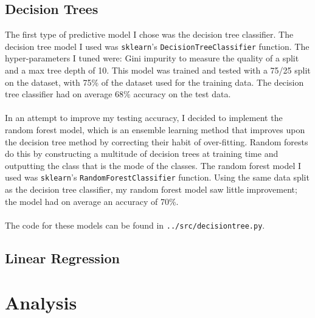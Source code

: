 \documentclass[12pt, notitlepage]{article}
\begin{document}
\subsection{Decision Trees}
The first type of predictive model I chose was the decision tree classifier. The decision tree model I used was \texttt{sklearn}'s \texttt{DecisionTreeClassifier} function. The hyper-parameters I tuned were: Gini impurity to measure the quality of a split and a max tree depth of 10. This model was trained and tested with a 75/25 split on the dataset, with 75\% of the dataset used for the training data. The decision tree classifier had on average 68\% accuracy on the test data.\\\\
In an attempt to improve my testing accuracy, I decided to implement the random forest model, which is an ensemble learning method that improves upon the decision tree method by correcting their habit of over-fitting. Random forests do this by constructing a multitude of decision trees at training time and outputting the class that is the mode of the classes. The random forest model I used was \texttt{sklearn}'s \texttt{RandomForestClassifier} function. Using the same data split as the decision tree classifier, my random forest model saw little improvement; the model had on average an accuracy of 70\%. \\\\
The code for these models can be found in \texttt{../src/decisiontree.py}.
\subsection{Linear Regression}


\section{Analysis}
\end{document}
